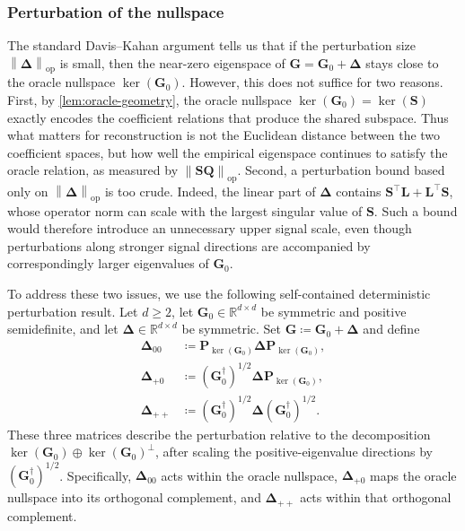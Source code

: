 \documentclass[11pt]{article}
\newcommand{\trans}{\top}
\newcommand{\opn}[1]{\left\lVert #1\right\rVert_{\mathrm{op}}}
\begin{document}
\subsubsection{Perturbation of the nullspace}


The standard Davis--Kahan
argument tells us that if the perturbation size $\opn{\bm\Delta}$ is small,
then the near-zero eigenspace of $\bm G=\bm G_0+\bm\Delta$ stays close to
the oracle nullspace $\ker(\bm G_0)$.  However, this does not suffice for
two reasons.  First, by \cref{lem:oracle-geometry}, the oracle nullspace
$\ker(\bm G_0)=\ker(\bm S)$ exactly encodes the coefficient relations that
produce the shared subspace.  Thus what matters for reconstruction is not
the Euclidean distance between the two coefficient spaces, but how well the
empirical eigenspace continues to satisfy the oracle relation, as measured by
$\opn{\bm S\bm Q}$.  Second, a perturbation bound based only on
$\opn{\bm\Delta}$ is too crude.  Indeed, the linear part of $\bm\Delta$
contains $\bm S^\trans\bm L+\bm L^\trans\bm S$, whose operator norm can
scale with the largest singular value of $\bm S$.  Such a bound would
therefore introduce an unnecessary upper signal scale, even though
perturbations along stronger signal directions are accompanied by
correspondingly larger eigenvalues of $\bm G_0$.

To address these two issues, we use the following self-contained deterministic
perturbation result. Let $d\ge 2$, let
$\bm G_0\in\mathbb R^{d\times d}$ be symmetric and positive semidefinite, and
let $\bm\Delta\in\mathbb R^{d\times d}$ be symmetric. Set
$\bm G\coloneqq\bm G_0+\bm\Delta$ and define
\begin{equation}
\label{eq:relative-blocks}
\begin{aligned}
  \bm\Delta_{00}
  &\coloneqq
  \bm P_{\ker(\bm G_0)}\bm\Delta\bm P_{\ker(\bm G_0)},
  \\
  \bm\Delta_{+0}
  &\coloneqq
  (\bm G_0^\dagger)^{1/2}\bm\Delta\bm P_{\ker(\bm G_0)},
  \\
  \bm\Delta_{++}
  &\coloneqq
  (\bm G_0^\dagger)^{1/2}\bm\Delta(\bm G_0^\dagger)^{1/2}.
\end{aligned}
\end{equation}
These three matrices describe the perturbation relative to the
decomposition
$\ker(\bm G_0)\oplus\ker(\bm G_0)^\perp$, after scaling the
positive-eigenvalue directions by $(\bm G_0^\dagger)^{1/2}$.  Specifically,
$\bm\Delta_{00}$ acts within the oracle nullspace,
$\bm\Delta_{+0}$ maps the oracle nullspace into its orthogonal complement,
and $\bm\Delta_{++}$ acts within that orthogonal complement.
\end{document}
